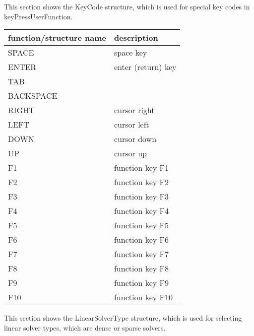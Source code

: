 \label{sec:KeyCode}
This section shows the KeyCode structure, which is used for special key codes in keyPressUserFunction.



\begin{center}
\footnotesize
\begin{longtable}{| p{8cm} | p{8cm} |} 
\hline
{\bf function/structure name} & {\bf description}\\ \hline
  SPACE & space key\\ \hline  
  ENTER & enter (return) key\\ \hline  
  TAB & \\ \hline  
  BACKSPACE & \\ \hline  
  RIGHT & cursor right\\ \hline  
  LEFT & cursor left\\ \hline  
  DOWN & cursor down\\ \hline  
  UP & cursor up\\ \hline  
  F1 & function key F1\\ \hline  
  F2 & function key F2\\ \hline  
  F3 & function key F3\\ \hline  
  F4 & function key F4\\ \hline  
  F5 & function key F5\\ \hline  
  F6 & function key F6\\ \hline  
  F7 & function key F7\\ \hline  
  F8 & function key F8\\ \hline  
  F9 & function key F9\\ \hline  
  F10 & function key F10\\ \hline  
\end{longtable}
\end{center}

\label{sec:LinearSolverType}
This section shows the LinearSolverType structure, which is used for selecting linear solver types, which are dense or sparse solvers.



